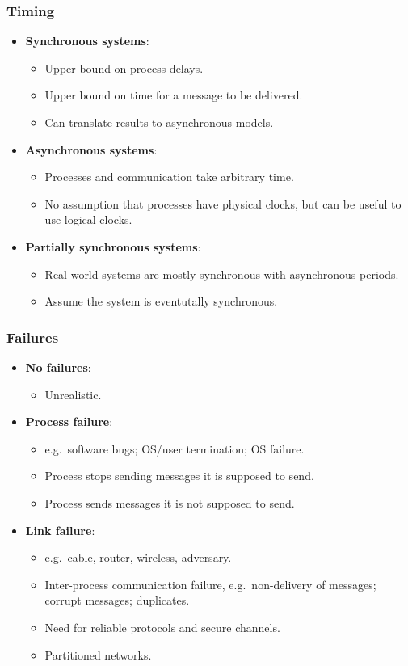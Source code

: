\documentclass[11pt]{article}
\begin{document}
\subsubsection{Timing}
\begin{itemize}
  \item \textbf{Synchronous systems}:
    \begin{itemize}
      \item Upper bound on process delays.
      \item Upper bound on time for a message to be delivered.
      \item Can translate results to asynchronous models.
    \end{itemize}
  \item \textbf{Asynchronous systems}:
    \begin{itemize}
      \item Processes and communication take arbitrary time.
      \item No assumption that processes have physical clocks, but can be useful to use logical clocks.
    \end{itemize}
  \item \textbf{Partially synchronous systems}:
    \begin{itemize}
      \item Real-world systems are mostly synchronous with asynchronous periods.
      \item Assume the system is eventutally synchronous.
    \end{itemize}
\end{itemize}

\subsubsection{Failures}
\begin{itemize}
  \item \textbf{No failures}:
    \begin{itemize}
      \item Unrealistic.
    \end{itemize}
  \item \textbf{Process failure}:
    \begin{itemize}
      \item e.g.\ software bugs; OS/user termination; OS failure.
      \item Process stops sending messages it is supposed to send.
      \item Process sends messages it is not supposed to send.
    \end{itemize}
  \item \textbf{Link failure}:
    \begin{itemize}
      \item e.g.\ cable, router, wireless, adversary.
      \item Inter-process communication failure, e.g.\ non-delivery of messages; corrupt messages; duplicates.
      \item Need for reliable protocols and secure channels.
      \item Partitioned networks.
    \end{itemize}
\end{itemize}
\end{document}
